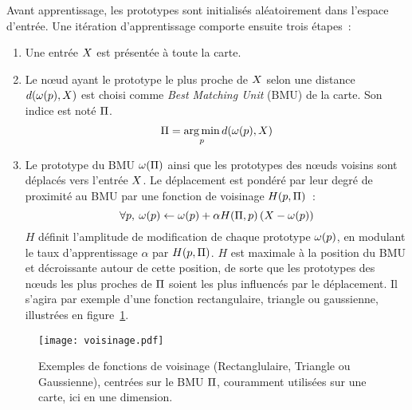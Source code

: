 \documentclass[../main]{subfiles}
\begin{document}
Avant apprentissage, les prototypes sont initialisés aléatoirement dans l'espace d'entrée.
Une itération d'apprentissage comporte ensuite trois étapes~:
\begin{enumerate}
\item Une entrée $X$ est présentée à toute la carte.
\item Le n\oe{}ud ayant le prototype le plus proche de $X$ selon une distance $d(\omega(p), X)$ est choisi comme \emph{Best Matching Unit} (BMU) de la carte. Son indice est noté $\Pi$. 
\begin{equation}
    \Pi = \operatorname*{arg\,min}\limits_p d(\omega(p),X)
\end{equation}
\item Le prototype du BMU $\omega(\Pi)$ ainsi que les prototypes des n\oe{}uds voisins sont déplacés vers l'entrée $X$. Le déplacement est pondéré par leur degré de proximité au BMU par une fonction de voisinage $H(p,\Pi)$~:
\begin{equation} \forall p, \:\omega(p) \leftarrow \omega(p) + \alpha H(\Pi,p) \left( X - \omega(p)\right) \end{equation}
$H$ définit l'amplitude de modification de chaque prototype $\omega(p)$, en modulant le taux d'apprentissage $\alpha$ par $H(p,\Pi)$. $H$ est maximale à la position du BMU et décroissante autour de cette position, de sorte que les prototypes des n\oe{}uds les plus proches de $\Pi$ soient les plus influencés par le déplacement. Il s'agira par exemple d'une fonction rectangulaire, triangle ou gaussienne, illustrées en figure~\ref{fig:h}.
\end{enumerate}

\begin{figure}
     \centering
     \texttt{[image: voisinage.pdf]}
     \caption{Exemples de fonctions de voisinage (Rectanglulaire, Triangle ou Gaussienne), centrées sur le BMU $\Pi$, couramment utilisées sur une carte, ici en une dimension.\label{fig:h}}
\end{figure}
\end{document}
